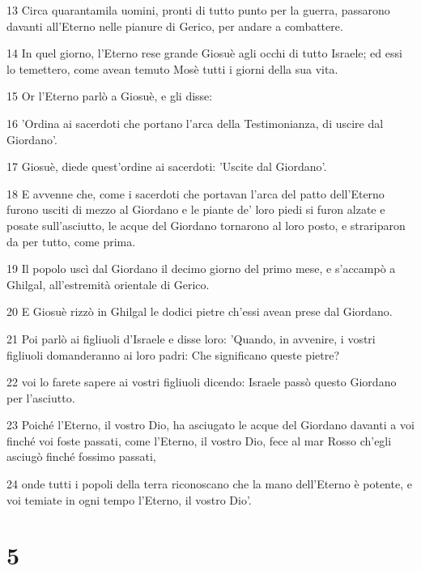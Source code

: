 \par 13 Circa quarantamila uomini, pronti di tutto punto per la guerra, passarono davanti all'Eterno nelle pianure di Gerico, per andare a combattere.
\par 14 In quel giorno, l'Eterno rese grande Giosuè agli occhi di tutto Israele; ed essi lo temettero, come avean temuto Mosè tutti i giorni della sua vita.
\par 15 Or l'Eterno parlò a Giosuè, e gli disse:
\par 16 'Ordina ai sacerdoti che portano l'arca della Testimonianza, di uscire dal Giordano'.
\par 17 Giosuè, diede quest'ordine ai sacerdoti: 'Uscite dal Giordano'.
\par 18 E avvenne che, come i sacerdoti che portavan l'arca del patto dell'Eterno furono usciti di mezzo al Giordano e le piante de' loro piedi si furon alzate e posate sull'asciutto, le acque del Giordano tornarono al loro posto, e strariparon da per tutto, come prima.
\par 19 Il popolo uscì dal Giordano il decimo giorno del primo mese, e s'accampò a Ghilgal, all'estremità orientale di Gerico.
\par 20 E Giosuè rizzò in Ghilgal le dodici pietre ch'essi avean prese dal Giordano.
\par 21 Poi parlò ai figliuoli d'Israele e disse loro: 'Quando, in avvenire, i vostri figliuoli domanderanno ai loro padri: Che significano queste pietre?
\par 22 voi lo farete sapere ai vostri figliuoli dicendo: Israele passò questo Giordano per l'asciutto.
\par 23 Poiché l'Eterno, il vostro Dio, ha asciugato le acque del Giordano davanti a voi finché voi foste passati, come l'Eterno, il vostro Dio, fece al mar Rosso ch'egli asciugò finché fossimo passati,
\par 24 onde tutti i popoli della terra riconoscano che la mano dell'Eterno è potente, e voi temiate in ogni tempo l'Eterno, il vostro Dio'.

\chapter{5}

